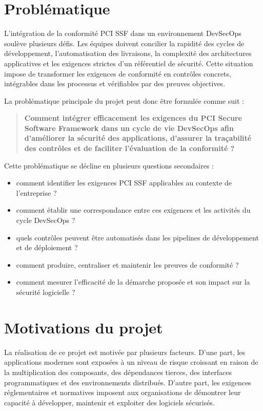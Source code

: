 \documentclass[12pt,a4paper]{report}
\begin{document}
\section{Problématique}

L'intégration de la conformité PCI SSF dans un environnement DevSecOps soulève plusieurs défis. Les équipes doivent concilier la rapidité des cycles de développement, l'automatisation des livraisons, la complexité des architectures applicatives et les exigences strictes d'un référentiel de sécurité. Cette situation impose de transformer les exigences de conformité en contrôles concrets, intégrables dans les processus et vérifiables par des preuves objectives.

La problématique principale du projet peut donc être formulée comme suit :

\begin{quote}
    \textbf{Comment intégrer efficacement les exigences du PCI Secure Software Framework dans un cycle de vie DevSecOps afin d'améliorer la sécurité des applications, d'assurer la traçabilité des contrôles et de faciliter l'évaluation de la conformité ?}
\end{quote}

Cette problématique se décline en plusieurs questions secondaires :

\begin{itemize}
    \item comment identifier les exigences PCI SSF applicables au contexte de l'entreprise ?
    \item comment établir une correspondance entre ces exigences et les activités du cycle DevSecOps ?
    \item quels contrôles peuvent être automatisés dans les pipelines de développement et de déploiement ?
    \item comment produire, centraliser et maintenir les preuves de conformité ?
    \item comment mesurer l'efficacité de la démarche proposée et son impact sur la sécurité logicielle ?
\end{itemize}

\section{Motivations du projet}

La réalisation de ce projet est motivée par plusieurs facteurs. D'une part, les applications modernes sont exposées à un niveau de risque croissant en raison de la multiplication des composants, des dépendances tierces, des interfaces programmatiques et des environnements distribués. D'autre part, les exigences réglementaires et normatives imposent aux organisations de démontrer leur capacité à développer, maintenir et exploiter des logiciels sécurisés.
\end{document}
